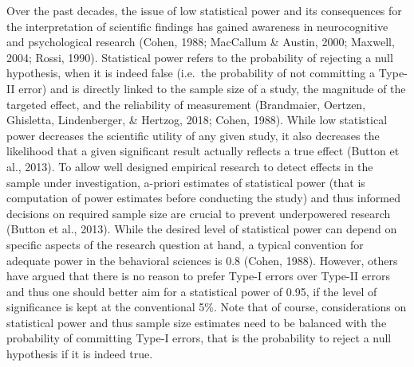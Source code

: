 \documentclass[
  man,floatsintext]{apa6}
\begin{document}
Over the past decades, the issue of low statistical power and its consequences for the interpretation of scientific findings has gained awareness in neurocognitive and psychological research (Cohen, 1988; MacCallum \& Austin, 2000; Maxwell, 2004; Rossi, 1990). Statistical power refers to the probability of rejecting a null hypothesis, when it is indeed false (i.e.~the probability of not committing a Type-II error) and is directly linked to the sample size of a study, the magnitude of the targeted effect, and the reliability of measurement (Brandmaier, Oertzen, Ghisletta, Lindenberger, \& Hertzog, 2018; Cohen, 1988). While low statistical power decreases the scientific utility of any given study, it also decreases the likelihood that a given significant result actually reflects a true effect (Button et al., 2013). To allow well designed empirical research to detect effects in the sample under investigation, a-priori estimates of statistical power (that is computation of power estimates before conducting the study) and thus informed decisions on required sample size are crucial to prevent underpowered research (Button et al., 2013). While the desired level of statistical power can depend on specific aspects of the research question at hand, a typical convention for adequate power in the behavioral sciences is 0.8 (Cohen, 1988). However, others have argued that there is no reason to prefer Type-I errors over Type-II errors and thus one should better aim for a statistical power of 0.95, if the level of significance is kept at the conventional 5\%. Note that of course, considerations on statistical power and thus sample size estimates need to be balanced with the probability of committing Type-I errors, that is the probability to reject a null hypothesis if it is indeed true.
\end{document}
